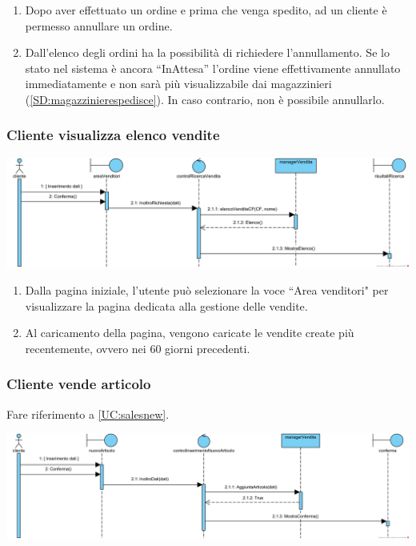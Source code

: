 \documentclass[12pt]{article}
\begin{document}
\begin{enumerate}
\item Dopo aver effettuato un ordine e prima che venga spedito, ad un cliente è permesso annullare un ordine.
\item Dall'elenco degli ordini ha la possibilità di richiedere l'annullamento. Se lo stato nel sistema è ancora ``InAttesa'' l'ordine viene effettivamente annullato immediatamente e non sarà più visualizzabile dai magazzinieri (\ref{SD:magazzinierespedisce}). In caso contrario, non è possibile annullarlo.
\end{enumerate}

\newpage

\subsubsection{Cliente visualizza elenco vendite}
\label{SD:elencovendite}

\begin{center}
\includegraphics[width=\textwidth]{SequenceDiagram/ClienteVenditaRicerca}
\end{center}

\begin{enumerate}
\item Dalla pagina iniziale, l'utente può selezionare la voce ``Area venditori" per visualizzare la pagina dedicata alla gestione delle vendite.
\item Al caricamento della pagina, vengono caricate le vendite create più recentemente, ovvero nei 60 giorni precedenti.
\end{enumerate}

\subsubsection{Cliente vende articolo}
\label{SD:creazionevendita}

Fare riferimento a \ref{UC:salesnew}. \\

\begin{center}
\includegraphics[width=\textwidth]{SequenceDiagram/ClienteVenditaCrea}
\end{center}
\end{document}
